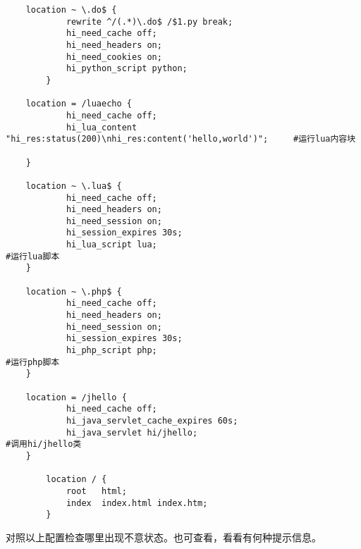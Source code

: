 \begin{lstlisting}
	location ~ \.do$ {
            rewrite ^/(.*)\.do$ /$1.py break;
            hi_need_cache off;
            hi_need_headers on;
            hi_need_cookies on;
            hi_python_script python;
        }

	location = /luaecho {
            hi_need_cache off;
            hi_lua_content "hi_res:status(200)\nhi_res:content('hello,world')";		#运行lua内容块
	
	}

	location ~ \.lua$ {
            hi_need_cache off;
            hi_need_headers on;
            hi_need_session on;
            hi_session_expires 30s;
            hi_lua_script lua;													#运行lua脚本
	}
	
	location ~ \.php$ {
            hi_need_cache off;
            hi_need_headers on;
            hi_need_session on;
            hi_session_expires 30s;
            hi_php_script php;													#运行php脚本
	}
	
	location = /jhello {
            hi_need_cache off;
            hi_java_servlet_cache_expires 60s;
            hi_java_servlet hi/jhello;											#调用hi/jhello类
	}

        location / {
            root   html;
            index  index.html index.htm;
        }
\end{lstlisting}
对照以上配置检查哪里出现不意状态。也可查看，看看有何种提示信息。








